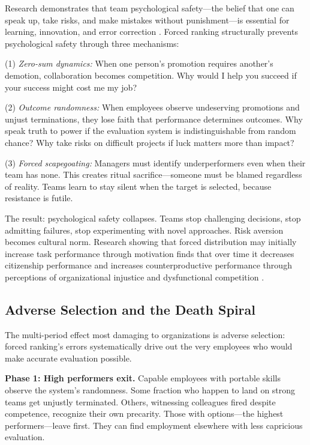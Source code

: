 \documentclass[12pt]{article}
\begin{document}
Research demonstrates that team psychological safety---the belief that one can speak up, take risks, and make mistakes without punishment---is essential for learning, innovation, and error correction \citep{edmondson1999}. Forced ranking structurally prevents psychological safety through three mechanisms:

(1) \emph{Zero-sum dynamics:} When one person's promotion requires another's demotion, collaboration becomes competition. Why would I help you succeed if your success might cost me my job?

(2) \emph{Outcome randomness:} When employees observe undeserving promotions and unjust terminations, they lose faith that performance determines outcomes. Why speak truth to power if the evaluation system is indistinguishable from random chance? Why take risks on difficult projects if luck matters more than impact?

(3) \emph{Forced scapegoating:} Managers must identify underperformers even when their team has none. This creates ritual sacrifice---someone must be blamed regardless of reality. Teams learn to stay silent when the target is selected, because resistance is futile.

The result: psychological safety collapses. Teams stop challenging decisions, stop admitting failures, stop experimenting with novel approaches. Risk aversion becomes cultural norm. Research showing that forced distribution may initially increase task performance through motivation finds that over time it decreases citizenship performance and increases counterproductive performance through perceptions of organizational injustice and dysfunctional competition \citep{moon2016precarious}.

\subsection{Adverse Selection and the Death Spiral}

The multi-period effect most damaging to organizations is adverse selection: forced ranking's errors systematically drive out the very employees who would make accurate evaluation possible.

\textbf{Phase 1: High performers exit.} Capable employees with portable skills observe the system's randomness. Some fraction who happen to land on strong teams get unjustly terminated. Others, witnessing colleagues fired despite competence, recognize their own precarity. Those with options---the highest performers---leave first. They can find employment elsewhere with less capricious evaluation.
\end{document}
